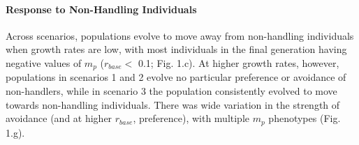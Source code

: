 \documentclass[11pt]{article}
\begin{document}
\paragraph{Response to Non-Handling Individuals}

Across scenarios, populations evolve to move away from non-handling individuals when growth rates are low, with most individuals in the final generation having negative values of $m_p$ ($r_{base} <$ 0.1; Fig. 1.c).
At higher growth rates, however, populations in scenarios 1 and 2 evolve no particular preference or avoidance of non-handlers, while in scenario 3 the population consistently evolved to move towards non-handling individuals.
There was wide variation in the strength of avoidance (and at higher $r_{base}$, preference), with multiple $m_p$ phenotypes (Fig. 1.g).
\end{document}
